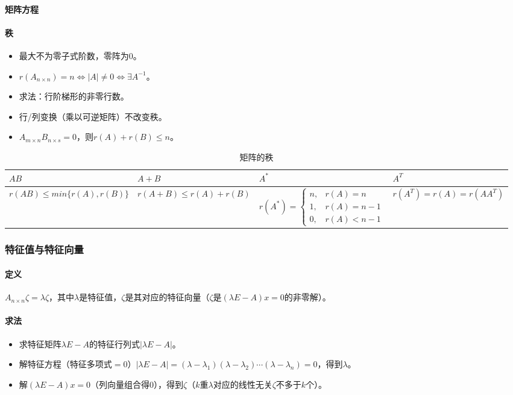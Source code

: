 \documentclass[
12pt, %
a4paper, 
oneside, %
]{scrartcl}
\begin{document}
\paragraph{矩阵方程}
\paragraph{秩}
\begin{itemize}
\item 最大不为零子式阶数，零阵为$ 0 $。
\item $ r(A_{n \times n}) = n \Leftrightarrow |A| \neq 0 \Leftrightarrow \exists A^{-1} $。
\item 求法：行阶梯形的非零行数。
\item 行/列变换（乘以可逆矩阵）不改变秩。
\item $ A_{m \times n} B_{n \times s} = 0 $，则$ r(A) + r(B) \leq n $。
\end{itemize}

\begin{table}[H]
\centering
\begin{tabular}{|p{3.8cm}|p{3.8cm}|p{3.8cm}|p{3.8cm}|}
\hline
$ AB $ & $ A + B $ & $ A^* $ & $ A^T $ \\
\hline
$ r(AB) \leq min\{r(A), r(B)\} $ & $ r(A + B) \leq r(A) + r(B) $ & $ r(A^*) = \begin{cases} n, &r(A) = n \\ 1, &r(A) = n - 1 \\ 0, &r(A) < n - 1 \end{cases} $ & $ r(A^T) = r(A) = r(A A^T) $ \\
\hline
\end{tabular}
\caption{矩阵的秩}
\end{table}
\subsubsection[特征值与特征向量]{特征值与特征向量}
\paragraph{定义}
$ A_{n \times n}\zeta = \lambda \zeta $，其中$ \lambda $是特征值，$ \zeta $是其对应的特征向量（$ \zeta $是$ (\lambda E - A)x = 0 $的非零解）。
\paragraph{求法}
\begin{itemize}
\item 求特征矩阵$ \lambda E - A $的特征行列式$ |\lambda E - A| $。
\item 解特征方程（特征多项式$ = 0 $）$ |\lambda E - A| = (\lambda - \lambda_1)(\lambda - \lambda_2) \cdots (\lambda - \lambda_n) = 0 $，得到$ \lambda $。
\item 解$ (\lambda E - A)x = 0 $（列向量组合得$ 0 $），得到$ \zeta $（$ k $重$ \lambda $对应的线性无关$ \zeta $不多于$ k $个）。
\end{itemize}
\end{document}
